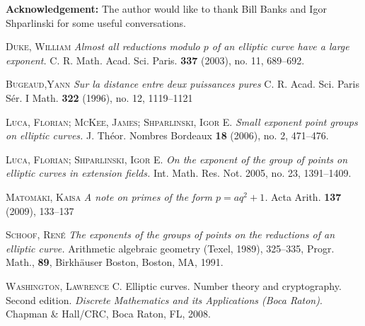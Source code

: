 \documentclass{amsart}
\begin{document}
\noindent\textbf{Acknowledgement:} The author would like to thank Bill Banks and Igor Shparlinski
for some useful conversations. 

\begin{thebibliography}{99}
\textsc{Duke, William}
\textit{Almost all reductions modulo $p$ of an elliptic curve have a large exponent.}  C. R. Math. Acad. Sci. Paris.  
\textbf{337}  (2003),  no. 11, 689--692.

\textsc{Bugeaud,Yann}
\textit{Sur la distance entre deux puissances pures}
C. R. Acad. Sci. Paris S\'er. I Math. \textbf{322} (1996), no. 12, 1119--1121

\textsc{Luca, Florian; McKee, James; Shparlinski, Igor E.} 
\textit{Small exponent point groups on elliptic curves.}
J. Th\'eor. Nombres Bordeaux  \textbf{18}  (2006),  no. 2, 471--476.

\textsc{Luca, Florian; Shparlinski, Igor E.} 
\textit{On the exponent of the group of points on elliptic curves in extension fields.} Int. Math. Res. Not. 2005, no. 23, 1391--1409.

\textsc{Matom\"aki, Kaisa}
\textit{A note on primes of the form $p=aq^2+1$.}
Acta Arith. \textbf{137} (2009), 133--137

\textsc{Schoof, Ren\'e}
\textit{The exponents of the groups of points on the reductions of an elliptic curve.}
Arithmetic algebraic geometry (Texel, 1989), 325--335, Progr. Math., \textbf{89}, Birkh\"auser Boston,
Boston, MA, 1991.

\textsc{Washington, Lawrence C.} 
Elliptic curves. Number theory and cryptography. Second edition. 
\textit{Discrete Mathematics and its Applications (Boca Raton)}. 
Chapman \& Hall/CRC, Boca Raton, FL, 2008.
\end{thebibliography}
\end{document}
